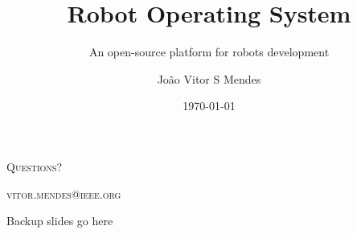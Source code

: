 \documentclass{cubeamer}
\title{Robot Operating System}
\subtitle{An open-source platform for robots development}
\author[João Vitor S Mendes]{João Vitor S Mendes}
\date{\today} %
\institute[SENAI CIMATEC]{SENAI CIMATEC - IEEE ROBOTICS AND AUTOMATION SOCIETY}
\begin{document}
\maketitle

\cutoc







\begin{frame}[standout]
    \Huge\textsc{Questions?}
    
    \vfill
    
    \LARGE\textsc{vitor.mendes@ieee.org}
\end{frame}

\appendix

\begin{frame}{Backup slides go here}
    
\end{frame}
\end{document}

